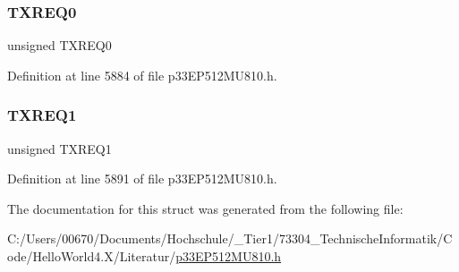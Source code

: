 \mbox{\label{structtag_c2_t_r01_c_o_n_b_i_t_s_af1df88e53ab7e28b18741e1a0a1fbcd7}} 
\subsubsection{\texorpdfstring{T\+X\+R\+E\+Q0}{TXREQ0}}
{\footnotesize\ttfamily unsigned T\+X\+R\+E\+Q0}



Definition at line 5884 of file p33\+E\+P512\+M\+U810.\+h.

\mbox{\label{structtag_c2_t_r01_c_o_n_b_i_t_s_a68518d5d2618c8ec06a28b757b066c17}} 
\subsubsection{\texorpdfstring{T\+X\+R\+E\+Q1}{TXREQ1}}
{\footnotesize\ttfamily unsigned T\+X\+R\+E\+Q1}



Definition at line 5891 of file p33\+E\+P512\+M\+U810.\+h.



The documentation for this struct was generated from the following file\+:\begin{DoxyCompactItemize}
\item 
C\+:/\+Users/00670/\+Documents/\+Hochschule/\+\_\+\+Tier1/73304\+\_\+\+Technische\+Informatik/\+Code/\+Hello\+World4.\+X/\+Literatur/\hyperlink{p33_e_p512_m_u810_8h}{p33\+E\+P512\+M\+U810.\+h}\end{DoxyCompactItemize}
